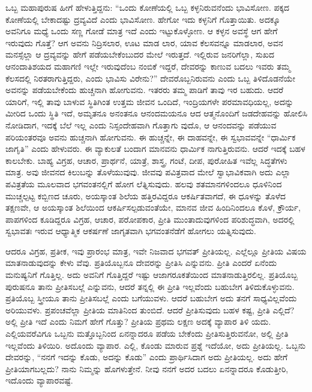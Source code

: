 \vskip 0.5cm

ಒಬ್ಬ ಮಹಾಪುರುಷ ಹೀಗೆ ಹೇಳುತ್ತಿದ್ದನು: “ಒಂದು ಕೋಣೆಯಲ್ಲಿ ಒಬ್ಬ ಕಳ್ಳನಿರುವನೆಂದು ಭಾವಿಸೋಣ. ಪಕ್ಕದ ಕೋಣೆಯಲ್ಲಿ ಬೇಕಾದಷ್ಟು ದ್ರವ್ಯವಿದೆ ಎಂದು ಭಾವಿಸೋಣ. ಹೇಗೋ ಇದು ಕಳ್ಳನಿಗೆ ಗೊತ್ತಾಯಿತು. ಅದಕ್ಕೂ ಅವನಿಗೂ ಮಧ್ಯೆ ಒಂದು ಸಣ್ಣ ಗೋಡೆ ಮಾತ್ರ ಇದೆ ಎಂದು ಇಟ್ಟುಕೊಳ್ಳೋಣ. ಆ ಕಳ್ಳನ ಅವಸ್ಥೆ ಆಗ ಹೇಗೆ ಇರುವುದು ಗೊತ್ತೆ? ಆಗ ಅವನು ನಿದ್ರಿಸಲಾರ, ಊಟ ಮಾಡ ಲಾರ, ಯಾವ ಕೆಲಸವನ್ನೂ ಮಾಡಲಾರ, ಅವನ ಮನಸ್ಸೆಲ್ಲಾ ಆ ದ್ರವ್ಯವನ್ನು ಹೇಗೆ ಪಡೆಯಬೇಕೆಂಬುದರ ಮೇಲೆ ಇರುತ್ತದೆ. ಇಲ್ಲಿರುವ ಜನರಿಗೆಲ್ಲಾ, ಸುಖದ ಆನಂದಾತಿಶಯದ ಮಹಾಗಣಿ ಇಲ್ಲೇ ಇರುವುದೆಂಬ ನಂಬಿಕೆ ಇದ್ದರೆ, ದೇವರನ್ನು ಕಾಣುವ ಬದಲು ಇವರು ತಮ್ಮ ಕೆಲಸದಲ್ಲಿ ನಿರತರಾಗುತ್ತಿದ್ದರು, ಎಂದು ಭಾವಿಸು ವಿರೇನು?” ದೇವರೊಬ್ಬನಿರುವನು ಎಂದು ಒಬ್ಬ ತಿಳಿದೊಡನೆಯೇ ಅವನನ್ನು ಪಡೆಯಬೇಕೆಂದು ಹುಚ್ಚನಾಗಿ ಹೋಗುವನು. ಇತರರು ತಮ್ಮ ಪಾಡಿಗೆ ತಾವು ಇರ ಬಹುದು. ಆದರೆ ಯಾರಿಗೆ, ಇಲ್ಲಿ ತಾವು ಬಾಳುವ ಸ್ಥಿತಿಗಿಂತ ಉತ್ತಮ ಜೀವನ ಒಂದಿದೆ, ಇಂದ್ರಿಯಗಳೇ ಪರಮಾವಧಿಯಲ್ಲ, ಅದನ್ನು ಮೀರಿದ ಒಂದು ಸ್ಥಿತಿ ಇದೆ, ಅಮೃತನೂ ಅನಂತನೂ ಆನಂದಮಯನೂ ಆದ ಆತ್ಮನೊಂದಿಗೆ ಜಡದೇಹವನ್ನು ಹೋಲಿಸಿ ನೋಡಿದಾಗ, ಇದಕ್ಕೆ ಬೆಲೆ ಇಲ್ಲ ಎಂದು ನಿಸ್ಸಂದೇಹವಾಗಿ ಗೊತ್ತಾಗು ವುದೊ, ಆ ಆನಂದವನ್ನು ಪಡೆಯುವ ಪರಿಯಂತರವೂ ಅವನು ಹುಚ್ಚನಾಗಿ ಹೋಗುವನು. ಈ ಹುಚ್ಚನ್ನೇ, ಈ ದಾಹವನ್ನೇ, ಈ ಸ್ವಭಾವವನ್ನೇ “ಧಾರ್ಮಿಕ ಜಾಗೃತಿ” ಎಂದು ಹೇಳುವರು. ಈ ವ್ಯಾಕುಲತೆ ಬಂದಾಗ ಮಾನವನು ಧಾರ್ಮಿಕ ನಾಗುತ್ತಿರುವನು. ಆದರೆ ಇದಕ್ಕೆ ಬಹಳ ಕಾಲಬೇಕು. ಬಾಹ್ಯ ವಿಗ್ರಹ, ಆಚಾರ, ಪ್ರಾರ್ಥನೆ, ಯಾತ್ರೆ, ಶಾಸ್ತ್ರ, ಗಂಟೆ, ದೀಪ, ಪುರೋಹಿತ ಇವೆಲ್ಲ ಸಿದ್ಧತೆಗಳು ಮಾತ್ರ. ಅವು ಜೀವನದ ಕಿಲುಬನ್ನು ತೊಳೆಯುವುವು. ಜೀವವು ಪವಿತ್ರವಾದ ಮೇಲೆ ಸ್ವಾಭಾವಿಕವಾಗಿ ಅದು ಎಲ್ಲಾ ಪವಿತ್ರತೆಯ ಮೂಲವಾದ ಭಗವಂತನಲ್ಲಿಗೆ ಹೋಗ ಲೆತ್ನಿಸುವುದು. ಹಲವು ಶತಮಾನಗಳಿಂದಲೂ ಧೂಳಿನಿಂದ ಮುಚ್ಚಲ್ಪಟ್ಟ ಕಬ್ಬಿಣದ ಚೂರು, ಅಯಸ್ಕಾಂತ ಶಿಲೆಯ ಹತ್ತಿರವಿದ್ದರೂ ಆಕರ್ಷಿತವಾಗದೆ, ಈ ಧೂಳನ್ನು ತೊಳೆದ ತಕ್ಷಣವೇ, ಆ ಅಯಸ್ಕಾಂತ ಶಿಲೆಯಿಂದ ಆಕರ್ಷಿಸಲ್ಪಡುವಂತೆಯೇ, ಮಾನವ ಜೀವ ಹಿಂದಿನಿಂದಲೂ ಕೊಳೆ, ಕ್ರೌರ್ಯ, ಪಾಪಗಳಿಂದ ಕೂಡಿದ್ದರೂ ವಿಗ್ರಹ, ಆಚಾರ, ಪರೋಪಕಾರ, ಪ್ರೀತಿ ಮುಂತಾದುವುಗಳಿಂದ ಪರಿಶುದ್ಧವಾಗಿ, ಅದರಲ್ಲಿ ಸ್ವಭಾವತಃ ಇರುವ ಆಧ್ಯಾತ್ಮಿಕ ಆಕರ್ಷಣೆ ಜಾಗೃತವಾಗಿ ಭಗವಂತನೆಡೆಗೆ ಹೋಗಲು ಯತ್ನಿಸುವುದು.

ಆದರೂ ವಿಗ್ರಹ, ಪ್ರತೀಕ, ಇವು ಪ್ರಾರಂಭ ಮಾತ್ರ, ಇವೇ ನಿಜವಾದ ಭಗವತ್​ ಪ್ರೀತಿಯಲ್ಲ. ಎಲ್ಲೆಲ್ಲೂ ಪ್ರೀತಿಯ ವಿಷಯ ಮಾತನಾಡುವುದನ್ನು ಕೇಳು ವೆವು. ಪ್ರತಿಯೊಬ್ಬನೂ ದೇವರನ್ನು ಪ್ರೀತಿಸಿ ಎನ್ನುವನು. ಪ್ರೀತಿ ಎಂದರೆ ಏನೆಂದು ಮನುಷ್ಯನಿಗೆ ಗೊತ್ತಿಲ್ಲ. ಅದು ಅವನಿಗೆ ಗೊತ್ತಿದ್ದರೆ ಇಷ್ಟು ಆಜಾಗರೂಕತೆಯಿಂದ ಮಾತನಾಡುತ್ತಿರಲಿಲ್ಲ. ಪ್ರತಿಯೊಬ್ಬ ಪುರುಷನೂ ತಾನು ಪ್ರೀತಿಸಬಲ್ಲೆ ಎನ್ನುವನು, ಆದರೆ ತನ್ನಲ್ಲಿ ಈ ಪ್ರೀತಿ ಇಲ್ಲವೆಂದು ಬಹುಬೇಗ ತಿಳಿದುಕೊಳ್ಳುವನು. ಪ್ರತಿಯೊಬ್ಬ ಸ್ತ್ರೀಯೂ ತಾನು ಪ್ರೀತಿಸಬಲ್ಲೆ ಎಂದು ಬಗೆಯುವಳು. ಆದರೆ ಬಹುಬೇಗ ಅದು ತನಗೆ ಸಾಧ್ಯವಿಲ್ಲವೆಂದು ಅರಿಯುವಳು. ಪ್ರಪಂಚವೆಲ್ಲಾ ಪ್ರೀತಿಯ ಮಾತಿನಿಂದ ತುಂಬಿದೆ. ಆದರೆ ಪ್ರೀತಿಸುವುದು ಬಹಳ ಕಷ್ಟ, ಪ್ರೀತಿ ಎಲ್ಲಿದೆ? ಅಲ್ಲಿ ಪ್ರೀತಿ ಇದೆ ಎಂದು ನಿಮಗೆ ಹೇಗೆ ಗೊತ್ತು? ಪ್ರೀತಿಯ ಪ್ರಥಮ ಲಕ್ಷಣ ಅದಕ್ಕೆ ವ್ಯಾಪಾರ ತಿಳಿ ಯದು. ಎಲ್ಲಿಯವರೆವಿಗೂ ಒಬ್ಬನು ಮತ್ತೊಬ್ಬನಿಂದ ಏನನ್ನಾದರೂ ಪಡೆಯ ಬೇಕೆಂದು ಪ್ರೀತಿಸುತ್ತಿರುವನೋ, ಅಲ್ಲಿ ಪ್ರೀತಿ ಇಲ್ಲವೆಂದು ತಿಳಿಯಿರಿ. ಅದೊಂದು ವ್ಯಾಪಾರ. ಎಲ್ಲಿ, ಕೊಂಡು ಮಾರುವ ಪ್ರಶ್ನೆ ಇದೆಯೋ, ಅದು ಪ್ರೀತಿಯಲ್ಲ. ಒಬ್ಬನು ದೇವರನ್ನು, “ನನಗೆ ಇದನ್ನು ಕೊಡು, ಅದನ್ನು ಕೊಡು” ಎಂದು ಪ್ರಾರ್ಥಿಸಿದಾಗ ಅದು ಪ್ರೀತಿಯಲ್ಲ. ಅದು ಹೇಗೆ ಪ್ರೀತಿಯಾಗಬಲ್ಲದು? ನಾನು ನಿಮ್ಮನ್ನು ಹೊಗಳುತ್ತೇನೆ. ನೀವು ನನಗೆ ಅದರ ಬದಲು ಏನನ್ನಾದರೂ ಕೊಡುತ್ತೀರಿ, ಇದೊಂದು ವ್ಯಾಪಾರವಷ್ಟೆ.

